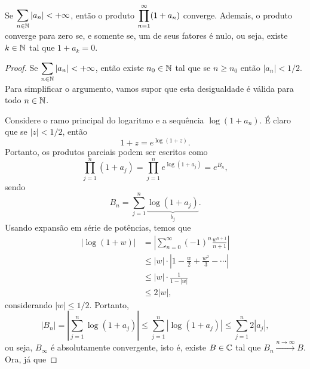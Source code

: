     
    \begin{proposicao}
    \label{prop:prod-inf}
        Se $\displaystyle{\sum_{n\in\mathbb{N}} |a_n| < +\infty }$, então o produto
        $\displaystyle{ \prod_{n=1}^{\infty} (1+a_n) }$ converge. Ademais, o produto converge
        para zero se, e somente se, um de seus fatores é nulo, ou seja, existe
        $k\in\mathbb{N}$ tal que $1+a_k = 0$.
    \end{proposicao}
    \begin{proof}
       Se $\displaystyle{\sum_{n\in\mathbb{N}} |a_n| < +\infty }$, então existe $n_0\in\mathbb{N}$
       tal que se $n\geq n_0$ então $|a_n| < 1/2$. Para simplificar o 
       argumento, vamos supor que esta desigualdade é válida para todo $n\in\mathbb{N}$.
       
       Considere o ramo principal do logaritmo e a sequência $\log(1+a_n)$.
       É claro que se $|z| < 1/2$, então
       \begin{equation*}
           1 + z = e^{\log(1+z)}.
       \end{equation*}
       Portanto, os produtos parciais podem ser escritos como
       \begin{equation*}
           \prod_{j=1}^n (1 + a_j) = \prod_{j=1}^n e^{\log(1 + a_j)} = e^{B_n},
       \end{equation*}
       sendo
       \begin{equation*}
           B_n = \sum_{j=1}^n \underbrace{\log(1 + a_j)}_{b_j}.
       \end{equation*}
       Usando expansão em série de potências, temos que
       \begin{align*}
           |\log(1+w)|&=\left| \sum_{n=0}^{\infty} (-1)^n \frac{w^{n+1}}{n+1} \right| \\
                      &\leq |w|\cdot\left| 1 - \frac{w}{2} + \frac{w^2}{3} 
                      - \cdots \right| \\
                      &\leq |w|\cdot\frac{1}{1 - |w|} \\
                      &\leq 2|w|,
       \end{align*}
       considerando $|w| \leq 1/2$. Portanto,
       \begin{equation*}
           |B_n| = \left| \sum_{j=1}^n \log(1 + a_j) \right| 
           \leq \sum_{j=1}^n |\log(1+a_j)|
           \leq \sum_{j=1}^n 2|a_j|,
       \end{equation*}
       ou seja, $B_{\infty}$ é absolutamente convergente, isto é, existe
       $B\in\mathbb{C}$ tal que $B_n \xrightarrow{n\to\infty} B$. Ora, já que

\end{proof}
